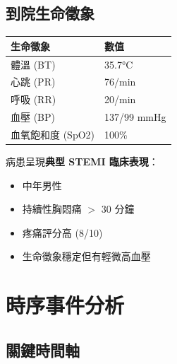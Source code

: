 \documentclass[12pt,a4paper]{article}
\begin{document}
\subsection{到院生命徵象}

\begin{longtable}{p{4cm}p{10cm}}
\toprule
\textbf{生命徵象} & \textbf{數值} \\
\midrule
\endhead
體溫 (BT) & 35.7°C \\
心跳 (PR) & 76/min \\
呼吸 (RR) & 20/min \\
血壓 (BP) & 137/99 mmHg \\
血氧飽和度 (SpO2) & 100\% \\
\bottomrule
\end{longtable}

\begin{keypoint}
病患呈現\textbf{典型 STEMI 臨床表現}：
\begin{itemize}[noitemsep]
\item 中年男性
\item 持續性胸悶痛 $>$ 30 分鐘
\item 疼痛評分高 (8/10)
\item 生命徵象穩定但有輕微高血壓
\end{itemize}
\end{keypoint}

\newpage
\section{時序事件分析}

\subsection{關鍵時間軸}
\end{document}
